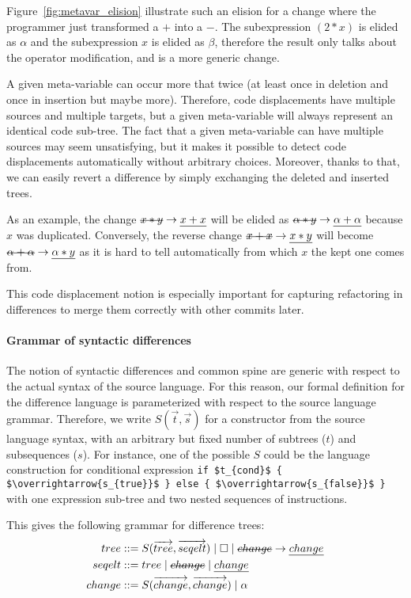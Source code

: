 \documentclass[a4paper,11pt]{article}
\newcommand\typsep{\mathrel{|}}
\newcommand\mathst[1]{\text{\st{$#1$}}}
\newcommand\mathul[1]{\text{\ul{$#1$}}}
\newcommand\id{\square}
\newcommand\change[2]{\mathst{#1} \rightarrow \mathul{#2}}
\begin{document}
Figure~\ref{fig:metavar_elision} illustrate such an elision for a change where the programmer just transformed a $+$ into a $-$. The subexpression $(2*x)$ is elided as $\alpha$ and the subexpression $x$ is elided as $\beta$, therefore the result only talks about the operator modification, and is a more generic change.

A given meta-variable can occur more that twice (at least once in deletion and once in insertion but maybe more). Therefore, code displacements have multiple sources and multiple targets, but a given meta-variable will always represent an identical code sub-tree. The fact that a given meta-variable can have multiple sources may seem unsatisfying, but it makes it possible to detect code displacements automatically without arbitrary choices. Moreover, thanks to that, we can easily revert a difference by simply exchanging the deleted and inserted trees.

As an example, the change $\change{x*y}{x+x}$ will be elided as $\change{\alpha*y}{\alpha+\alpha}$ because $x$ was duplicated.
Conversely, the reverse change $\change{x+x}{x*y}$ will become $\change{\alpha+\alpha}{\alpha*y}$ as it is hard to tell automatically from which $x$ the kept one comes from.

This code displacement notion is especially important for capturing refactoring in differences to merge them correctly with other commits later.

\paragraph{Grammar of syntactic differences} The notion of syntactic differences and common spine are generic with
respect to the actual syntax of the source language. For this reason,
our formal definition for the difference language is parameterized
with respect to the source language grammar.  Therefore, we write
$S(\overrightarrow{t}, \overrightarrow{s})$ for a constructor from the
source language syntax, with an arbitrary but fixed number of subtrees
($t$) and subsequences ($s$). For instance, one of the possible $S$
could be the language construction for conditional expression
\lstinline[mathescape]|if $t_{cond}$ { $\overrightarrow{s_{true}}$ } else { $\overrightarrow{s_{false}}$ }|
with one expression sub-tree and two nested sequences of instructions.

This gives the following grammar for difference trees:
\begin{align*}
tree &::= S(\overrightarrow{tree}, \overrightarrow{seqelt}) \typsep \id \typsep \change{change}{change}\\
seqelt &::= tree \typsep \mathst{change} \typsep \mathul{change}\\
change &::= S(\overrightarrow{change}, \overrightarrow{change}) \typsep \alpha\\
\end{align*}
\end{document}
